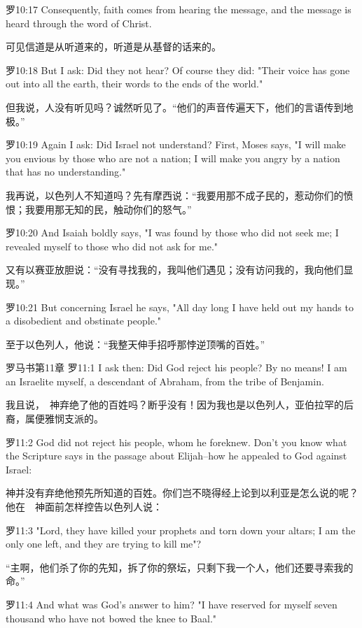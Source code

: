 \documentclass[a4paper,11pt,onecolumn,twoside]{ctexart}
\begin{document}
\begin{multicols}{2}
 罗10:17
 Consequently, faith comes from hearing the message, and the message is heard through the word of Christ.

 可见信道是从听道来的，听道是从基督的话来的。


 罗10:18
 But I ask: Did they not hear? Of course they did: "Their voice has gone out into all the earth, their words to the ends of the world."

 但我说，人没有听见吗？诚然听见了。“他们的声音传遍天下，他们的言语传到地极。”


 罗10:19
 Again I ask: Did Israel not understand? First, Moses says, "I will make you envious by those who are not a nation; I will make you angry by a nation that has no understanding."

 我再说，以色列人不知道吗？先有摩西说：“我要用那不成子民的，惹动你们的愤恨；我要用那无知的民，触动你们的怒气。”


 罗10:20
 And Isaiah boldly says, "I was found by those who did not seek me; I revealed myself to those who did not ask for me."

 又有以赛亚放胆说：“没有寻找我的，我叫他们遇见；没有访问我的，我向他们显现。”


 罗10:21
 But concerning Israel he says, "All day long I have held out my hands to a disobedient and obstinate people."

 至于以色列人，他说：“我整天伸手招呼那悖逆顶嘴的百姓。”


 罗马书第11章
 罗11:1
 I ask then: Did God reject his people? By no means! I am an Israelite myself, a descendant of Abraham, from the tribe of Benjamin.

 我且说，　神弃绝了他的百姓吗？断乎没有！因为我也是以色列人，亚伯拉罕的后裔，属便雅悯支派的。


 罗11:2
 God did not reject his people, whom he foreknew. Don't you know what the Scripture says in the passage about Elijah--how he appealed to God against Israel:

 神并没有弃绝他预先所知道的百姓。你们岂不晓得经上论到以利亚是怎么说的呢？他在　神面前怎样控告以色列人说：


 罗11:3
 "Lord, they have killed your prophets and torn down your altars; I am the only one left, and they are trying to kill me"?

 “主啊，他们杀了你的先知，拆了你的祭坛，只剩下我一个人，他们还要寻索我的命。”


 罗11:4
 And what was God's answer to him? "I have reserved for myself seven thousand who have not bowed the knee to Baal."


\end{multicols}
\end{document}

